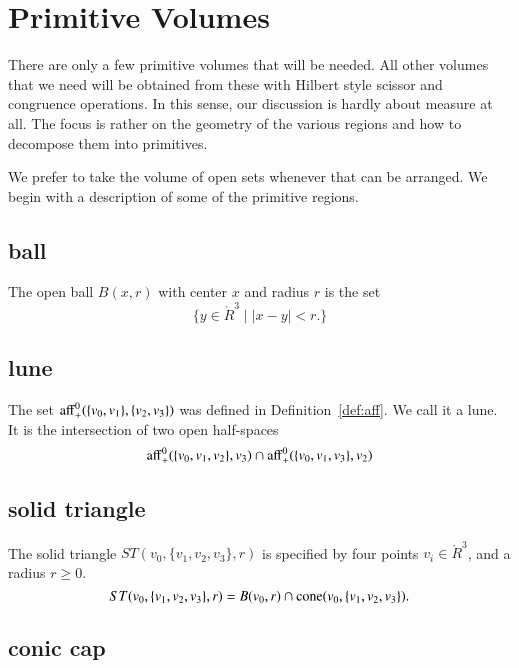 \section{Primitive Volumes}

There are only a few primitive volumes that will be needed.  All
other volumes that we need will be obtained from these with
Hilbert style scissor and congruence operations.  In this sense,
our discussion is hardly about measure at all.  The focus is rather on
the geometry of the various regions and how to decompose them into
primitives.

We prefer to take the volume of open sets whenever that can be
arranged.  We begin with a description of some of the primitive
regions.






\subsection{ball}

\begin{definition}  The open ball $B(x,r)$ with center $x$ and
radius $r$ is the set
    $$
    \{ y\in\ring{R}^3 \mid |x-y| < r.\}
    $$
\end{definition}


\subsection{lune}

The set ${\operatorname{aff}}^0_+(\{v_0,v_1\},\{v_2,v_3\})$ was defined
in Definition~\ref{def:aff}.  We call it a lune.  It is the intersection
of two open half-spaces
    $$
    {\operatorname{aff}}^0_+(\{v_0,v_1,v_2\},v_3)\cap
    {\operatorname{aff}}^0_+(\{v_0,v_1,v_3\},v_2)
    $$


\subsection{solid triangle}

\begin{definition} The solid triangle $ST(v_0,\{v_1,v_2,v_3\},r)$ is
specified by four points $v_i\in\ring{R}^3$, and a radius $r\ge0$. 
    $$
    ST(v_0,\{v_1,v_2,v_3\},r) = 
    B(v_0,r)\cap {\operatorname{cone}}(v_0,\{v_1,v_2,v_3\}).
    $$
\end{definition}



\subsection{conic cap}

